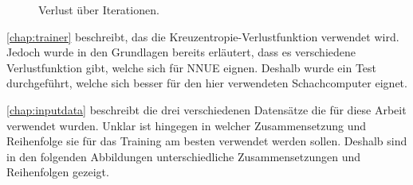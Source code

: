 \begin{figure}
  \centering
  \caption{Verlust über Iterationen.}
  \label{fig:loss}
\end{figure}



\autoref{chap:trainer} beschreibt, das die Kreuzentropie-Verlustfunktion verwendet wird. Jedoch wurde in den Grundlagen bereits erläutert, dass es verschiedene Verlustfunktion gibt, welche sich für \ac{NNUE} eignen. Deshalb wurde ein Test durchgeführt, welche sich besser für den hier verwendeten Schachcomputer eignet.

\autoref{chap:inputdata} beschreibt die drei verschiedenen Datensätze die für diese Arbeit verwendet wurden. Unklar ist hingegen in welcher Zusammensetzung und Reihenfolge sie für das Training am besten verwendet werden sollen. Deshalb sind in den folgenden Abbildungen unterschiedliche Zusammensetzungen und Reihenfolgen gezeigt.
